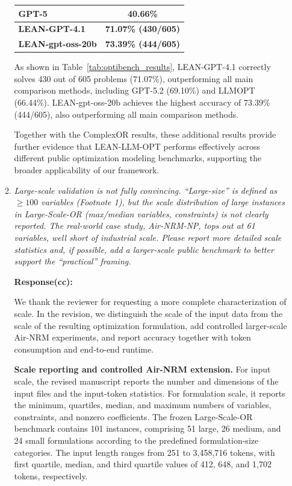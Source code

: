 \documentclass[11pt]{article}
\newcommand{\edit}[1]{{\color{hopkins-blue}\itshape #1}}
\begin{document}
\begin{enumerate}[label=(AssoE.\arabic*),leftmargin=*]
\begin{enumerate}[label=(R2.Major.\arabic*),leftmargin=*]
\begin{longtable}{lc}
GPT-5 \citep{team2025every}
& 40.66\% \\

\midrule

\textbf{LEAN-GPT-4.1}
& \textbf{71.07\% (430/605)} \\

\textbf{LEAN-gpt-oss-20b}
& \textbf{73.39\% (444/605)} \\

\end{longtable}


As shown in Table~\ref{tab:optibench_results}, LEAN-GPT-4.1 correctly solves 430 out of 605 problems (71.07\%), outperforming all main comparison methods, including GPT-5.2 (69.10\%) and LLMOPT (66.44\%). LEAN-gpt-oss-20b achieves the highest accuracy of 73.39\% (444/605), also outperforming all main comparison methods.

Together with the ComplexOR results, these additional results provide further evidence that LEAN-LLM-OPT performs effectively across different public optimization modeling benchmarks, supporting the broader applicability of our framework.


\item \edit{Large-scale validation is not fully convincing. ``Large-size'' is defined as $\geq 100$ variables (Footnote 1), but the scale distribution of large instances in Large-Scale-OR (max/median variables, constraints) is not clearly reported. The real-world case study, Air-NRM-NP, tops out at 61 variables, well short of industrial scale. Please report more detailed scale statistics and, if possible, add a larger-scale public benchmark to better support the ``practical'' framing.}\label{R2-major-2}

\noindent\textbf{Response(cc):}

We thank the reviewer for requesting a more complete characterization of
scale. In the revision, we distinguish the scale of the input data from the
scale of the resulting optimization formulation, add controlled larger-scale
Air-NRM experiments, and report accuracy together with token consumption and
end-to-end runtime.

\medskip
\noindent\textbf{Scale reporting and controlled Air-NRM extension.}
For input scale, the revised manuscript reports the number and dimensions of
the input files and the input-token statistics. For formulation scale, it
reports the minimum, quartiles, median, and maximum numbers of variables,
constraints, and nonzero coefficients. The frozen Large-Scale-OR benchmark
contains 101 instances, comprising 51 large, 26 medium, and 24 small
formulations according to the predefined formulation-size categories. The
input length ranges from 251 to 3,458,716 tokens, with first quartile, median,
and third quartile values of 412, 648, and 1,702 tokens, respectively.


\end{enumerate}
\end{enumerate}
\end{document}
